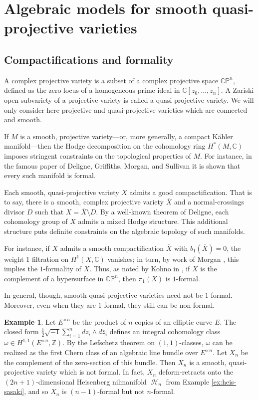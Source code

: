 \documentclass{article}
\numberwithin{equation}{section}
\theoremstyle{definition}
\newtheorem{example}[theorem]{Example}
\newcommand{\Z}{\mathbb{Z}}
\renewcommand{\C}{\mathbb{C}}
\newcommand{\CP}{\mathbb{CP}}
\DeclareMathOperator{\Heis}{\mathcal{H}}
\begin{document}
\section{Algebraic models for smooth quasi-projective varieties}
\label{sect:models-qp}

\subsection{Compactifications and formality}
\label{subsec:qproj}

A complex projective variety is a subset of a complex projective 
space $\CP^n$, defined as the zero-locus of a homogeneous prime ideal in 
$\C[z_0,\dots, z_n]$.  A Zariski open subvariety of a projective 
variety is called a quasi-projective variety.  We will only consider here 
projective and quasi-projective varieties which are connected and smooth. 

If $M$ is a smooth, projective variety---or, more generally, a compact 
K\"ahler manifold---then the Hodge decomposition on the cohomology 
ring $H^*(M,\C)$ imposes stringent constraints on the topological properties 
of $M$.  For instance, in the famous paper of Deligne, Griffiths, Morgan, 
and Sullivan \cite{DGMS} it is shown that every such manifold is formal. 
  
Each smooth, quasi-projective variety $X$ admits a good compactification.  
That is to say, there is a smooth, complex projective variety $\overline{X}$  and a 
normal-crossings divisor $D$ such that $X=\overline{X}\setminus D$. 
By a well-known theorem of Deligne, each cohomology group of 
$X$ admits a mixed Hodge structure.   This additional structure puts 
definite constraints on the algebraic topology of such manifolds.   

For instance, if $X$ admits a smooth compactification 
$\overline{X}$ with $b_1(\overline{X})=0$, the weight 
$1$ filtration on $H^1(X,\C)$ vanishes; in turn, by work 
of Morgan \cite{Mo}, this implies the $1$-formality of $X$.   
Thus, as noted by Kohno in \cite{Kohno}, if $X$ is the complement 
of a hypersurface in $\CP^n$, then $\pi_1(X)$ is $1$-formal.  

In general, though, smooth quasi-projective varieties need not 
be $1$-formal.  Moreover, even when they are $1$-formal, 
they still can be non-formal. 

\begin{example}
\label{ex:qp1f}
Let $E^{\times n}$ be the product of $n$ copies of an elliptic curve $E$.  
The closed form $\frac{1}{2} \sqrt{-1} \sum_{i=1}^n dz_i \wedge d\bar{z}_i$ 
defines an integral cohomology class $\omega\in H^{1,1}(E^{\times n},\Z)$.  
By the Lefschetz theorem on $(1,1)$-classes, 
$\omega$ can be realized as the first Chern class of an algebraic 
line bundle over $E^{\times n}$.  Let $X_n$ be the complement 
of the zero-section of this bundle. Then $X_n$ is a smooth, 
quasi-projective variety which is not formal.  In fact, $X_n$ 
deform-retracts onto the $(2n+1)$-dimensional Heisenberg 
nilmanifold $\Heis_n$ from Example \ref{ex:heis-sasaki}, and 
so $X_n$ is $(n-1)$-formal but not $n$-formal. 
\end{example}
\end{document}
